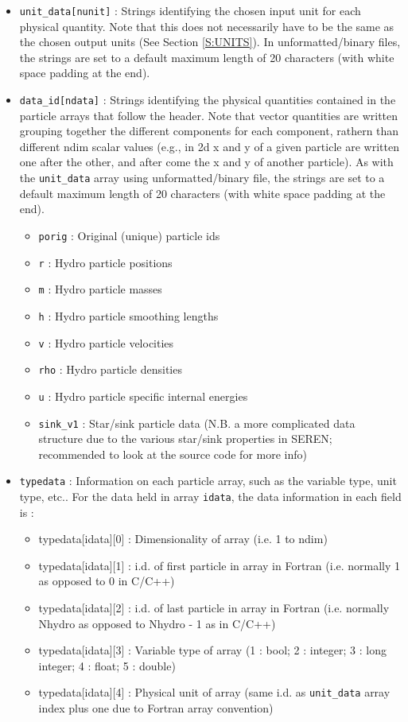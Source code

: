\documentclass[a4paper]{article}
\newcommand{\var}[1]{\texttt{#1}}
\begin{document}
\begin{itemize}
\begin{itemize}
\end{itemize}
\item \var{unit\_data[nunit]} : Strings identifying the chosen input unit for each physical quantity.  Note that this does not necessarily have to be the same as the chosen output units (See Section \ref{S:UNITS}).  In unformatted/binary files, the strings are set to a default maximum length of 20 characters (with white space padding at the end).
\item \var{data\_id[ndata]} : Strings identifying the physical quantities contained in the particle arrays that follow the header.  Note that vector quantities are written grouping together the different components for each component, rathern than different ndim scalar values (e.g., in 2d x and y of a given particle are written one after the other, and after come the x and y of another particle). As with the \var{unit\_data} array using unformatted/binary file, the strings are set to a default maximum length of 20 characters (with white space padding at the end).
\begin{itemize}
\item \var{porig} : Original (unique) particle ids
\item \var{r} : Hydro particle positions
\item \var{m} : Hydro particle masses
\item \var{h} : Hydro particle smoothing lengths
\item \var{v} : Hydro particle velocities
\item \var{rho} : Hydro particle densities
\item \var{u} : Hydro particle specific internal energies
\item \var{sink\_v1} : Star/sink particle data (N.B. a more complicated data structure due to the various star/sink properties in SEREN; recommended to look at the source code for more info)
\end{itemize}
\item \var{typedata} : Information on each particle array, such as the variable type, unit type, etc..  For the data held in array \var{idata}, the data information in each field is : 
\begin{itemize}
\item typedata[idata][0] : Dimensionality of array (i.e. 1 to ndim)
\item typedata[idata][1] : i.d. of first particle in array in Fortran (i.e. normally 1 as opposed to 0 in C/C++)
\item typedata[idata][2] : i.d. of last particle in array in Fortran (i.e. normally Nhydro as opposed to Nhydro - 1 as in C/C++)
\item typedata[idata][3] : Variable type of array (1 : bool; 2 : integer; 3 : long integer; 4 : float;  5 : double)
\item typedata[idata][4] : Physical unit of array (same i.d. as \var{unit\_data} array index plus one due to Fortran array convention)
\end{itemize}
\end{itemize}
\end{document}

